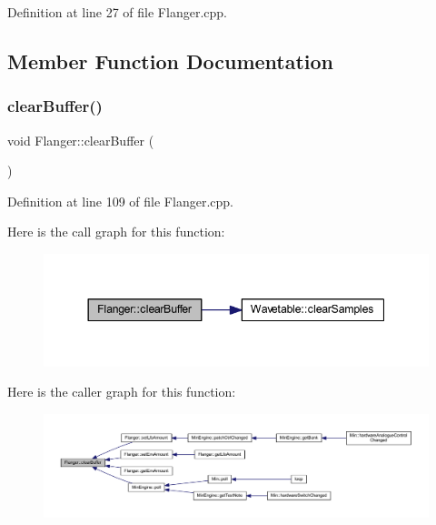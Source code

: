 Definition at line 27 of file Flanger.\+cpp.



\subsection{Member Function Documentation}
\mbox{\label{class_flanger_ae94929f1469d1924d24537e2b265796d}} 
\subsubsection{\texorpdfstring{clear\+Buffer()}{clearBuffer()}}
{\footnotesize\ttfamily void Flanger\+::clear\+Buffer (\begin{DoxyParamCaption}{ }\end{DoxyParamCaption})}



Definition at line 109 of file Flanger.\+cpp.

Here is the call graph for this function\+:
\nopagebreak
\begin{figure}[H]
\begin{center}
\leavevmode
\includegraphics[width=344pt]{class_flanger_ae94929f1469d1924d24537e2b265796d_cgraph}
\end{center}
\end{figure}
Here is the caller graph for this function\+:
\nopagebreak
\begin{figure}[H]
\begin{center}
\leavevmode
\includegraphics[width=350pt]{class_flanger_ae94929f1469d1924d24537e2b265796d_icgraph}
\end{center}
\end{figure}
\mbox{\label{class_flanger_ae86b7a0721c3a9893f3b9ec5f4b6c0fb}} 

